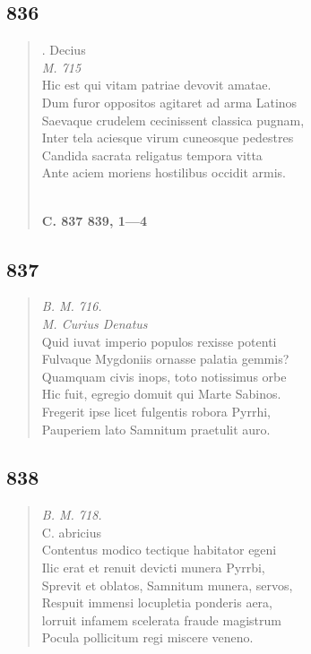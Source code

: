 \documentclass[11pt, a4paper]{report}
\begin{document}
            \subsection*{836}
      \begin{verse}
      . Decius \\ \textit{M. 715} \\ Hic est qui vitam patriae devovit amatae. \\ Dum furor oppositos agitaret ad arma Latinos \\ Saevaque crudelem cecinissent classica pugnam, \\ Inter tela aciesque virum cuneosque pedestres \\ Candida sacrata religatus tempora vitta \\ Ante aciem moriens hostilibus occidit armis. \\ 
        ﻿\pagebreak 
     \marginpar{[303]} \begin{center} \textbf{C. 837 839, 1—4} \end{center}
      \end{verse}
  
            \subsection*{837}
      \begin{verse}
      \textit{B. M. 716.} \\ \textit{M. Curius Denatus} \\ Quid iuvat imperio populos rexisse potenti \\ Fulvaque Mygdoniis ornasse palatia gemmis? \\ Quamquam civis inops, toto notissimus orbe \\ Hic fuit, egregio domuit qui Marte Sabinos. \\ Fregerit ipse licet fulgentis robora Pyrrhi, \\ Pauperiem lato Samnitum praetulit auro. \\ 
      \end{verse}
  
            \subsection*{838}
      \begin{verse}
      \textit{B. M. 718.} \\ C. abricius \\ Contentus modico tectique habitator egeni \\ Ilic erat et renuit devicti munera Pyrrbi, \\ Sprevit et oblatos, Samnitum munera, servos, \\ Respuit immensi locupletia ponderis aera, \\ lorruit infamem scelerata fraude magistrum \\ Pocula pollicitum regi miscere veneno. \\ 
      \end{verse}
  
\end{document}
